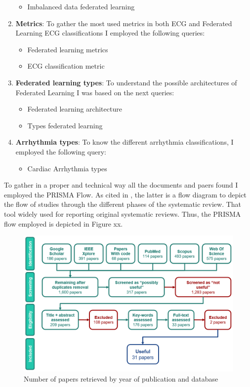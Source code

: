 \begin{enumerate}
\begin{itemize}
        \item Imbalanced data federated learning
    \end{itemize}
    \item \textbf{Metrics}: To gather the most used metrics in both ECG and Federated Learning ECG classifications I employed the following queries:
    \begin{itemize}
        \item Federated learning metrics
        \item ECG classification metric
    \end{itemize}
    \item \textbf{Federated learning types}: To understand the possible architectures of Federated Learning I was based on the next queries:
    \begin{itemize}
        \item Federated learning architecture
        \item Types federated learning
    \end{itemize}
    \item \textbf{Arrhythmia types}: To know the different arrhythmia classifications, I employed the following query:
    \begin{itemize}
        \item Cardiac Arrhythmia types
    \end{itemize}
\end{enumerate}

To gather in a proper and technical way all the documents and paers found I employed the PRISMA Flow. As cited in \cite{prisma_flow}, the latter is a flow diagram to depict the flow of studies through the different phases of the systematic review. That tool widely used for reporting original systematic reviews. Thus, the PRISMA flow employed is depicted in Figure xx.

 \begin{figure}[H]
\centering
\includegraphics[scale=0.54]{img/prisma_flow.png}
\caption{Number of papers retrieved by year of publication and database}
\label{fig:prisma_flow}
\end{figure}

